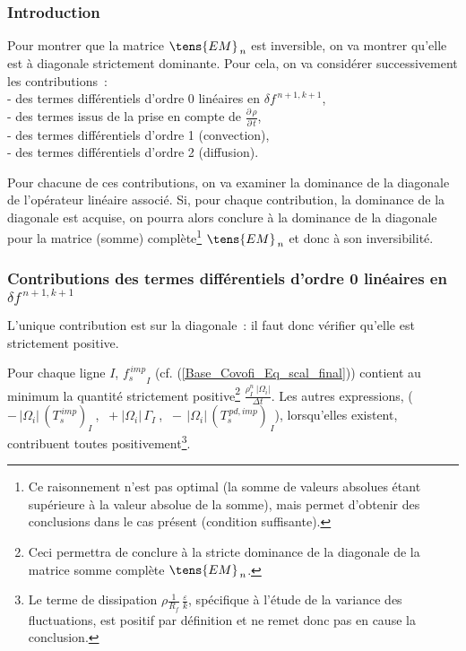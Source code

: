 \subsubsection*{Introduction}
Pour montrer que la matrice $\tens{EM}_{\,n}$ est inversible, on va
montrer qu'elle est \`a diagonale strictement dominante. Pour cela, on
va consid\'erer successivement les contributions~:\\
\hspace*{1cm}- des termes diff\'erentiels
d'ordre 0 lin\'eaires en $\delta f^{\,n+1,k+1}$,\\
\hspace*{1cm}- des termes issus de la prise en compte de
$\displaystyle \frac {{\partial}\,\rho}{{\partial}\,t}$,\\
\hspace*{1cm}- des termes diff\'erentiels d'ordre 1 (convection),\\
\hspace*{1cm}- des termes diff\'erentiels d'ordre 2 (diffusion).

Pour chacune de ces contributions, on va examiner la
dominance de la diagonale de l'op\'erateur lin\'eaire associ\'e.
Si, pour chaque contribution, la dominance de la diagonale est acquise, on pourra
alors conclure \`a la dominance de la diagonale pour la matrice (somme)
compl\`ete\footnote{Ce raisonnement n'est pas optimal (la somme de valeurs
absolues \'etant sup\'erieure \`a la valeur absolue de la somme), mais permet
d'obtenir des conclusions dans le cas pr\'esent (condition
suffisante).}
$\tens{EM}_{\,n}$ et donc \`a son inversibilit\'e.


\subsubsection*{Contributions des termes diff\'erentiels d'ordre 0 lin\'eaires en
$\delta f^{\,n+1,k+1}$}
\label{Base_Covofi_ContributionTermesdOrdre0}
L'unique contribution est sur la diagonale~: il faut donc v\'erifier qu'elle
est strictement positive.

Pour chaque ligne $I$,  ${f_s^{\,imp}}_I $
 (cf. (\ref{Base_Covofi_Eq_scal_final})) contient au minimum la quantit\'e strictement
positive\footnote{Ceci permettra de conclure \`a la stricte dominance de la
diagonale de la matrice somme compl\`ete $\tens{EM}_{\,n}$.}
 $\displaystyle \frac {\rho_I^n\ |\Omega_i|}{\Delta t}$.
Les autres expressions,
($-\,|\Omega_i|\,(T_s^{\,imp})_I\ $, $\ +|\Omega_i|\, \Gamma_I\ $, $\
-\,|\Omega_i|\,{(T_s^{\,pd,imp})}_{\,I}$),
lorsqu'elles existent, contribuent toutes positivement\footnote{Le terme de
dissipation $\rho\frac{1}{R_f}\,\frac{\varepsilon}{k}$, sp\'ecifique \`a l'\'{e}tude de la
variance des fluctuations, est positif par d\'{e}finition et ne remet donc pas en cause la
conclusion.}.

